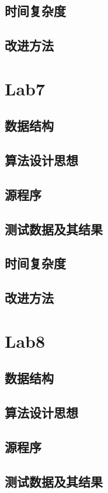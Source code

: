 \documentclass[a4paper,11pt,UTF8]{ctexart}
\begin{document}
\subsection{时间复杂度}
\subsection{改进方法}

\section{Lab7}
\subsection{数据结构}
\subsection{算法设计思想}
\subsection{源程序}
\subsection{测试数据及其结果}
\subsection{时间复杂度}
\subsection{改进方法}

\section{Lab8}
\subsection{数据结构}
\subsection{算法设计思想}
\subsection{源程序}
\subsection{测试数据及其结果}
\end{document}
